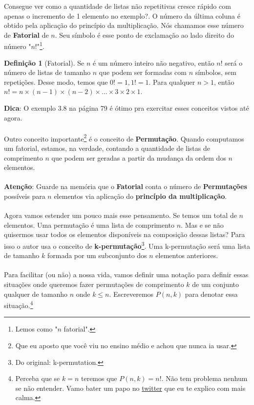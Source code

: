\documentclass[a4paper,11pt]{book}
\theoremstyle{definition}
\theoremstyle{break}
\newtheorem{definition}{Definição}[section]
\begin{document}
Consegue ver como a quantidade de listas não repetitivas cresce rápido com apenas o incremento de 1 elemento no exemplo?. O número da última coluna é obtido pela aplicação do princípio da multiplicação. Nós chamamos esse número de \textbf{Fatorial} de $n$. Seu símbolo é esse ponto de exclamação ao lado direito do número "$n!$"\footnote{Lemos como "$n$ fatorial".}.

\begin{definition}[Fatorial]
Se $n$ é um número inteiro não negativo, então $n!$ será o número de listas de tamanho $n$ que podem ser formadas com $n$ símbolos, sem repetições. Desse modo, temos que $0! = 1, 1! = 1$. Para qualquer $n > 1$, então $n! = n \times (n - 1) \times (n - 2) \times \dots \times 3 \times 2 \times 1 $.
\end{definition}

\textbf{Dica}: O exemplo 3.8 na página 79 é ótimo pra exercitar esses conceitos vistos até agora.
\\
\\
Outro conceito importante\footnote{Que eu aposto que você viu no ensino médio e achou que nunca ia usar.} é o conceito de \textbf{Permutação}. Quando computamos um fatorial, estamos, na verdade, contando a quantidade de listas de comprimento $n$ que podem ser geradas a partir da mudança da ordem dos $n$ elementos.
\\
\\
\textbf{Atenção}: Guarde na memória que o \textbf{Fatorial} conta o número de \textbf{Permutações} possíveis para $n$ elementos via aplicação do \textbf{princípio da multiplicação}.
\\
\\
Agora vamos estender um pouco mais esse pensamento. Se temos um total de $n$ elementos. Uma permutação é uma lista de comprimento $n$. Mas e se não quisermos usar todos os elementos disponíveis na composição dessas listas? Para isso o autor usa o conceito de \textbf{k-permutação}\footnote{Do original: k-permutation.}. Uma k-permutação será uma lista de tamanho $k$ formada por um subconjunto dos $n$ elementos anteriores.
\\
\\
Para facilitar (ou não) a nossa vida, vamos definir uma notação para definir essas situações onde queremos fazer permutações de comprimento $k$ de um conjunto qualquer de tamanho $n$ onde $k \leq n$. Escreveremos $P(n,k)$ para denotar essa situação.\footnote{Perceba que se $k = n$ teremos que $P(n,k) = n!$. Não tem problema nenhum se não entender. Vamo bater um papo no \href{https://twitter.com/bruno_ruas2}{twitter} que eu te explico com mais calma.} 
\end{document}
